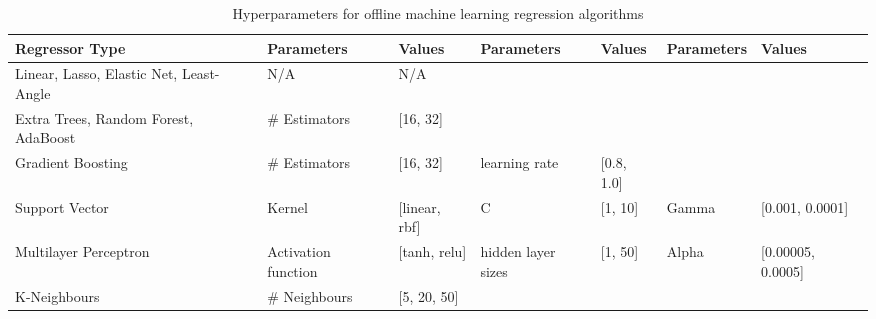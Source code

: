 \documentclass[final,3p,times,twocolumn,numbers]{elsarticle}
\begin{document}
\begin{table}
\centering
\footnotesize
\begin{tabular}{@{}lllllll@{}}
\toprule
\textbf{Regressor Type} & \textbf{Parameters} & \textbf{Values}   & \textbf{Parameters} & \textbf{Values} & \textbf{Parameters} & \textbf{Values}       \\ \midrule
Linear, Lasso, Elastic Net, Least-Angle                  & N/A                 & N/A               &                     &                 &                     &                       \\
Extra Trees, Random Forest, AdaBoost             & \# Estimators       & {[}16, 32{]}      &                     &                 &                     &                       \\
Gradient Boosting       & \# Estimators       & {[}16, 32{]}      & learning rate       & {[}0.8, 1.0{]}  &                     &                       \\
Support Vector          & Kernel              & {[}linear, rbf{]} & C                   & {[}1, 10{]}     & Gamma               & {[}0.001, 0.0001{]}   \\
Multilayer Perceptron   & Activation function & {[}tanh, relu{]}  & hidden layer sizes  & {[}1, 50{]}     & Alpha               & {[}0.00005, 0.0005{]} \\
K-Neighbours            & \# Neighbours       & {[}5, 20, 50{]}   &                     &                 &                     &                       \\ \bottomrule
\end{tabular}%
\caption{Hyperparameters for offline machine learning regression algorithms}
\label{table:hyperparameter-tuning-offline}


\qquad
\qquad
\qquad
\qquad


\end{table}
\end{document}
